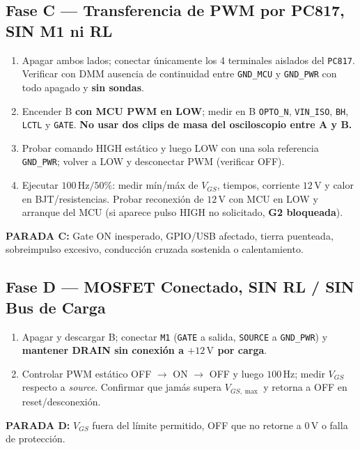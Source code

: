 \documentclass[10pt, a4paper, landscape]{article}
\begin{document}
\begin{minipage}[t]{0.48\linewidth}
\subsection*{Fase C — Transferencia de PWM por PC817, SIN M1 ni RL}
\begin{enumerate}[noitemsep, topsep=2pt]
    \item Apagar ambos lados; conectar únicamente los 4 terminales aislados del \texttt{PC817}. Verificar con DMM ausencia de continuidad entre \texttt{GND\_MCU} y \texttt{GND\_PWR} con todo apagado y \textbf{sin sondas}.
    \item Encender B \textbf{con MCU PWM en LOW}; medir en B \texttt{OPTO\_N}, \texttt{VIN\_ISO}, \texttt{BH}, \texttt{LCTL} y \texttt{GATE}. \textbf{No usar dos clips de masa del osciloscopio entre A y B.}
    \item Probar comando HIGH estático y luego LOW con una sola referencia \texttt{GND\_PWR}; volver a LOW y desconectar PWM (verificar OFF).
    \item Ejecutar $100\,\text{Hz}/50\%$: medir mín/máx de $V_{GS}$, tiempos, corriente $12\,\text{V}$ y calor en BJT/resistencias. Probar reconexión de $12\,\text{V}$ con MCU en LOW y arranque del MCU (si aparece pulso HIGH no solicitado, \textbf{G2 bloqueada}).
\end{enumerate}
\noindent\textbf{\textcolor{warnred}{PARADA C:}} Gate ON inesperado, GPIO/USB afectado, tierra puenteada, sobreimpulso excesivo, conducción cruzada sostenida o calentamiento.

\subsection*{Fase D — MOSFET Conectado, SIN RL / SIN Bus de Carga}
\begin{enumerate}[noitemsep, topsep=2pt]
    \item Apagar y descargar B; conectar \texttt{M1} (\texttt{GATE} a salida, \texttt{SOURCE} a \texttt{GND\_PWR}) y \textbf{mantener DRAIN sin conexión a $+12\,\text{V}$ por carga}.
    \item Controlar PWM estático OFF $\rightarrow$ ON $\rightarrow$ OFF y luego $100\,\text{Hz}$; medir $V_{GS}$ respecto a \textit{source}. Confirmar que jamás supera $V_{GS,\max}$ y retorna a OFF en reset/desconexión.
\end{enumerate}
\noindent\textbf{\textcolor{warnred}{PARADA D:}} $V_{GS}$ fuera del límite permitido, OFF que no retorne a $0\,\text{V}$ o falla de protección.


\end{minipage}
\end{document}
